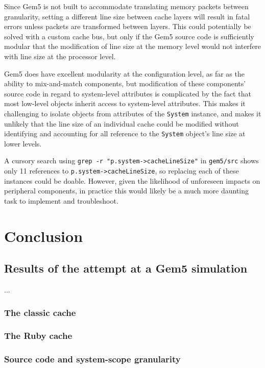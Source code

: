 \documentclass[12pt,twoside]{reedthesis}
\begin{document}
	Since Gem5 is not built to accommodate translating memory packets between granularity, setting a different line size between cache layers will result in fatal errors unless packets are transformed between layers. This could potentially be solved with a custom cache bus, but only if the Gem5 source code is sufficiently modular that the modification of line size at the memory level would not interfere with line size at the processor level.
	
	Gem5 does have excellent modularity at the configuration level, as far as the ability to mix-and-match components, but modification of these components' source code in regard to system-level attributes is complicated by the fact that most low-level objects inherit access to system-level attributes. This makes it challenging to isolate objects from attributes of the \verb`System` instance, and makes it unlikely that the line size of an individual cache could be modified without identifying and accounting for all reference to the \verb`System` object's line size at lower levels.

	A cursory search using \verb`grep -r "p.system->cacheLineSize"` in \verb`gem5/src` shows only 11 references to \verb`p.system->cacheLineSize`, so replacing each of these instances could be doable. However, given the likelihood of unforeseen impacts on peripheral components, in practice this would likely be a much more daunting task to implement and troubleshoot.

\chapter{Conclusion}

\section{Results of the attempt at a Gem5 simulation}

	...

	\subsection*{The classic cache}

	\subsection*{The Ruby cache}

	\subsection*{Source code and system-scope granularity}
\end{document}
